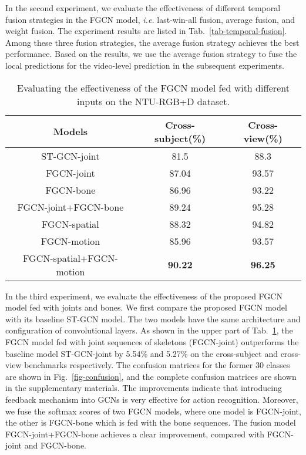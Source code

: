 \documentclass[runningheads]{llncs}
\begin{document}
In the second experiment, we evaluate the effectiveness of different temporal fusion strategies in the FGCN model, \textit{i.e.} last-win-all fusion, average fusion, and weight fusion. The experiment results are listed in Tab.~\ref{tab-temporal-fusion}. Among these three fusion strategies, the average fusion strategy achieves the best performance. Based on the results, we use the average fusion strategy to fuse the local predictions for the video-level prediction in the subsequent experiments.

\begin{table}[t]
	\caption{Evaluating the effectiveness of the FGCN model fed with different inputs on the NTU-RGB+D dataset.}
	\label{tab-joint-bone}
	\tabcolsep=6pt
	\centering
	\begin{tabular}{ccc}
		\hline
		Models & Cross-subject(\%) & Cross-view(\%) \\
		\hline
		ST-GCN-joint \cite{yan2018spatial} &81.5 &88.3\\
		FGCN-joint &87.04 &93.57	\\
		FGCN-bone	&86.96 &93.22 \\
		FGCN-joint+FGCN-bone	&89.24 &95.28 \\	
		\hline
		FGCN-spatial &88.32 &94.82	\\
		FGCN-motion	&85.96 &93.57 \\
		FGCN-spatial+FGCN-motion	&\textbf{90.22} &\textbf{96.25} \\	
		\hline
	\end{tabular}
\end{table}

In the third experiment, we evaluate the effectiveness of the proposed FGCN model fed with joints and bones. We first compare the proposed FGCN model with its baseline ST-GCN model. The two models have the same architecture and configuration of convolutional layers. As shown in the upper part of Tab.~\ref{tab-joint-bone}, the FGCN model fed with joint sequences of skeletons (FGCN-joint) outperforms the baseline model ST-GCN-joint by 5.54\% and 5.27\% on the cross-subject and cross-view benchmarks respectively. The confusion matrices for the former 30 classes are shown in Fig.~\ref{fig-confusion}, and the complete confusion matrices are shown in the supplementary materials. The improvements indicate that introducing feedback mechanism into GCNs is very effective for action recognition. Moreover, we fuse the softmax scores of two FGCN models, where one model is FGCN-joint, the other is FGCN-bone which is fed with the bone sequences. The fusion model FGCN-joint+FGCN-bone achieves a clear improvement, compared with FGCN-joint and FGCN-bone.
\end{document}
